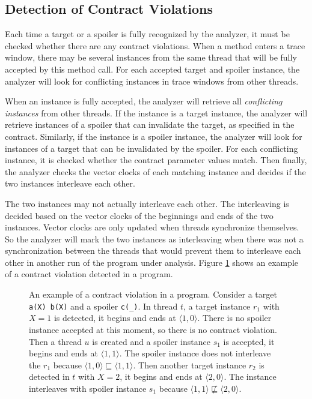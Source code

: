 \subsection{Detection of Contract Violations}
\label{violations}

Each time a target or a spoiler is fully recognized by the analyzer, it must be
checked whether there are any contract violations. When a method enters a trace
window, there may be several instances from the same thread that will be fully
accepted by this method call. For each accepted target and spoiler instance, the
analyzer will look for conflicting instances in trace windows from other
threads.

When an instance is fully accepted, the analyzer will retrieve all
\emph{conflicting instances} from other threads. If the instance is a target
instance, the analyzer will retrieve instances of a spoiler that can invalidate
the target, as specified in the contract. Similarly, if the instance is a
spoiler instance, the analyzer will look for instances of a target that can be
invalidated by the spoiler. For each conflicting instance, it is checked whether
the contract parameter values match. Then finally, the analyzer checks the
vector clocks of each matching instance and decides if the two instances
interleave each other.

The two instances may not actually interleave each other. The interleaving is
decided based on the vector clocks of the beginnings and ends of the two
instances. Vector clocks are only updated when threads synchronize themselves.
So the analyzer will mark the two instances as interleaving when there was not
a synchronization between the threads that would prevent them to interleave each
other in another run of the program under analysis. Figure
\ref{detectionExample} shows an example of a contract violation detected in a
program.

\begin{figure}[hbt]
    \begin{center}
        \label{detectionExample}
        
        \caption{An example of a contract violation in a program. Consider a
        target \texttt{a(X) b(X)} and a spoiler \texttt{c(\_)}. In thread $t$, a
        target instance $r_1$ with $X=1$ is detected, it begins and ends at
        $\langle 1,0 \rangle$. There is no spoiler instance accepted at this
        moment, so there is no contract violation. Then a thread $u$ is created
        and a spoiler instance $s_1$ is accepted, it begins and ends at $\langle
        1,1 \rangle$. The spoiler instance does not interleave the $r_1$ because
        $\langle 1,0 \rangle \sqsubseteq \langle 1,1 \rangle$.  Then another
        target instance $r_2$ is detected in $t$ with $X=2$, it begins and ends
        at $\langle 2,0 \rangle$. The instance interleaves with spoiler instance
        $s_1$ because $\langle 1,1 \rangle \nsqsubseteq \langle 2,0 \rangle$.}
    \end{center}
\end{figure}

